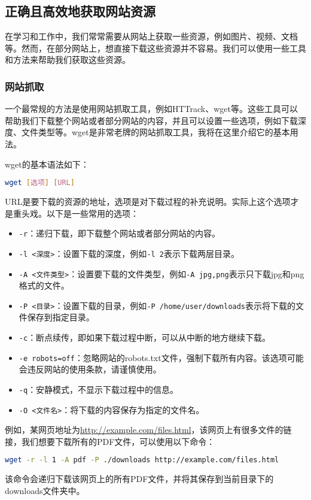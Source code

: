 \subsection{正确且高效地获取网站资源}\label{sec:web-get}

在学习和工作中，我们常常需要从网站上获取一些资源，例如图片、视频、文档等。然而，在部分网站上，想直接下载这些资源并不容易。我们可以使用一些工具和方法来帮助我们获取这些资源。

\subsubsection{网站抓取}

一个最常规的方法是使用网站抓取工具，例如HTTrack、wget等。这些工具可以帮助我们下载整个网站或者部分网站的内容，并且可以设置一些选项，例如下载深度、文件类型等。wget是非常老牌的网站抓取工具，我将在这里介绍它的基本用法。

wget的基本语法如下：
\begin{lstlisting}[language=bash]
    wget [选项] [URL]
\end{lstlisting}
URL是要下载的资源的地址，选项是对下载过程的补充说明。实际上这个选项才是重头戏。以下是一些常用的选项：
\begin{itemize}
  \item \texttt{-r}：递归下载，即下载整个网站或者部分网站的内容。
  \item \texttt{-l <深度>}：设置下载的深度，例如\texttt{-l 2}表示下载两层目录。
  \item \texttt{-A <文件类型>}：设置要下载的文件类型，例如\texttt{-A jpg,png}表示只下载jpg和png格式的文件。
  \item \texttt{-P <目录>}：设置下载的目录，例如\texttt{-P /home/user/downloads}表示将下载的文件保存到指定目录。
  \item \texttt{-c}：断点续传，即如果下载过程中断，可以从中断的地方继续下载。
  \item \texttt{-e robots=off}：忽略网站的robots.txt文件，强制下载所有内容。该选项可能会违反网站的使用条款，请谨慎使用。
  \item \texttt{-q}：安静模式，不显示下载过程中的信息。
  \item \texttt{-O <文件名>}：将下载的内容保存为指定的文件名。
\end{itemize}

例如，某网页地址为\url{http://example.com/files.html}，该网页上有很多文件的链接，我们想要下载所有的PDF文件，可以使用以下命令：
\begin{lstlisting}[language=bash]
  wget -r -l 1 -A pdf -P ./downloads http://example.com/files.html
\end{lstlisting}
该命令会递归下载该网页上的所有PDF文件，并将其保存到当前目录下的downloads文件夹中。

